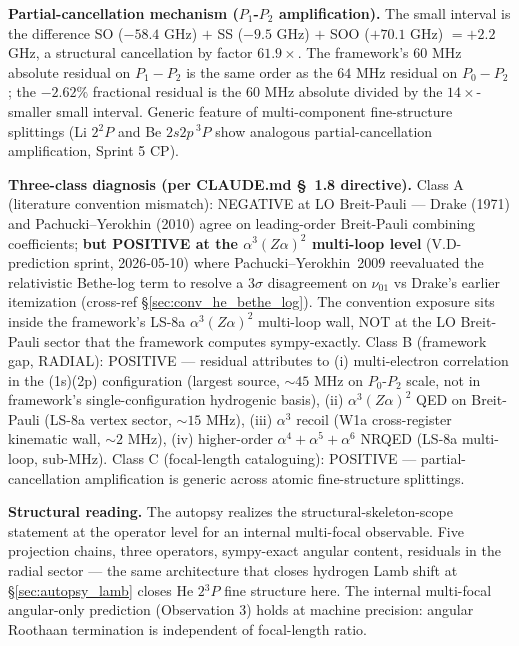 \documentclass[11pt]{article}
\begin{document}
\textbf{Partial-cancellation mechanism ($P_1$-$P_2$ amplification).}
The small interval is the difference SO ($-58.4$ GHz) $+$ SS
($-9.5$ GHz) $+$ SOO ($+70.1$ GHz) $= +2.2$ GHz, a structural
cancellation by factor $61.9\times$.  The framework's $60$ MHz
absolute residual on $P_1 - P_2$ is the same order as the $64$ MHz
residual on $P_0 - P_2$; the $-2.62\%$ fractional residual is the
$60$ MHz absolute divided by the $14\times$-smaller small interval.
Generic feature of multi-component fine-structure splittings (Li
$2{}^2P$ and Be $2s2p\,{}^3P$ show analogous partial-cancellation
amplification, Sprint 5 CP).

\textbf{Three-class diagnosis (per CLAUDE.md \S~1.8 directive).}
Class A (literature convention mismatch): NEGATIVE at LO Breit-Pauli ---
Drake (1971) and Pachucki--Yerokhin (2010) agree on leading-order
Breit-Pauli combining coefficients; \textbf{but POSITIVE at the
$\alpha^3(Z\alpha)^2$ multi-loop level} (V.D-prediction sprint,
2026-05-10) where Pachucki--Yerokhin~2009 reevaluated the relativistic
Bethe-log term to resolve a 3$\sigma$ disagreement on $\nu_{01}$ vs
Drake's earlier itemization (cross-ref \S\ref{sec:conv_he_bethe_log}).
The convention exposure sits inside the framework's LS-8a
$\alpha^3(Z\alpha)^2$ multi-loop wall, NOT at the LO Breit-Pauli sector
that the framework computes sympy-exactly.  Class B (framework gap,
RADIAL): POSITIVE --- residual
attributes to (i) multi-electron correlation in the (1s)(2p)
configuration (largest source, $\sim 45$ MHz on $P_0$-$P_2$ scale,
not in framework's single-configuration hydrogenic basis), (ii)
$\alpha^3(Z\alpha)^2$ QED on Breit-Pauli (LS-8a vertex sector,
$\sim 15$ MHz), (iii) $\alpha^3$ recoil (W1a cross-register
kinematic wall, $\sim 2$ MHz), (iv) higher-order $\alpha^4 + \alpha^5
+ \alpha^6$ NRQED (LS-8a multi-loop, sub-MHz).  Class C (focal-length
cataloguing): POSITIVE --- partial-cancellation amplification is
generic across atomic fine-structure splittings.

\textbf{Structural reading.}  The autopsy realizes the
structural-skeleton-scope statement at the operator level for an
internal multi-focal observable.  Five projection chains, three
operators, sympy-exact angular content, residuals in the radial
sector --- the same architecture that closes hydrogen Lamb shift at
\S\ref{sec:autopsy_lamb} closes He $2{}^3P$ fine structure here.
The internal multi-focal angular-only prediction (Observation 3)
holds at machine precision: angular Roothaan termination is
independent of focal-length ratio.
\end{document}
